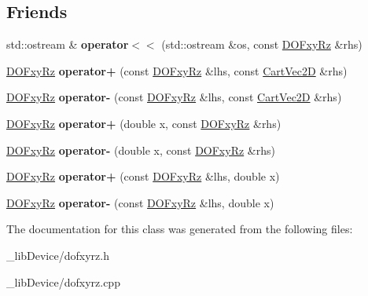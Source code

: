 \subsection*{Friends}
\begin{DoxyCompactItemize}
\item 
std\+::ostream \& {\bfseries operator$<$$<$} (std\+::ostream \&os, const \hyperlink{class_d_o_fxy_rz}{D\+O\+Fxy\+Rz} \&rhs)\hypertarget{class_d_o_fxy_rz_a1ac21ee73e0159236cde20f41914a132}{}\label{class_d_o_fxy_rz_a1ac21ee73e0159236cde20f41914a132}

\item 
\hyperlink{class_d_o_fxy_rz}{D\+O\+Fxy\+Rz} {\bfseries operator+} (const \hyperlink{class_d_o_fxy_rz}{D\+O\+Fxy\+Rz} \&lhs, const \hyperlink{class_cart_vec2_d}{Cart\+Vec2D} \&rhs)\hypertarget{class_d_o_fxy_rz_aea029119f4f15e337343dd9674c53314}{}\label{class_d_o_fxy_rz_aea029119f4f15e337343dd9674c53314}

\item 
\hyperlink{class_d_o_fxy_rz}{D\+O\+Fxy\+Rz} {\bfseries operator-\/} (const \hyperlink{class_d_o_fxy_rz}{D\+O\+Fxy\+Rz} \&lhs, const \hyperlink{class_cart_vec2_d}{Cart\+Vec2D} \&rhs)\hypertarget{class_d_o_fxy_rz_adb707d2ec2d85ef225d3ecedd0f72afa}{}\label{class_d_o_fxy_rz_adb707d2ec2d85ef225d3ecedd0f72afa}

\item 
\hyperlink{class_d_o_fxy_rz}{D\+O\+Fxy\+Rz} {\bfseries operator+} (double x, const \hyperlink{class_d_o_fxy_rz}{D\+O\+Fxy\+Rz} \&rhs)\hypertarget{class_d_o_fxy_rz_a3a29ac2f2a3ca9a5e9e960ce82f176bf}{}\label{class_d_o_fxy_rz_a3a29ac2f2a3ca9a5e9e960ce82f176bf}

\item 
\hyperlink{class_d_o_fxy_rz}{D\+O\+Fxy\+Rz} {\bfseries operator-\/} (double x, const \hyperlink{class_d_o_fxy_rz}{D\+O\+Fxy\+Rz} \&rhs)\hypertarget{class_d_o_fxy_rz_af2be5dcffff5323bcbfcaf49a4c291e8}{}\label{class_d_o_fxy_rz_af2be5dcffff5323bcbfcaf49a4c291e8}

\item 
\hyperlink{class_d_o_fxy_rz}{D\+O\+Fxy\+Rz} {\bfseries operator+} (const \hyperlink{class_d_o_fxy_rz}{D\+O\+Fxy\+Rz} \&lhs, double x)\hypertarget{class_d_o_fxy_rz_a504a54dd40576418831f0383ebd9f93a}{}\label{class_d_o_fxy_rz_a504a54dd40576418831f0383ebd9f93a}

\item 
\hyperlink{class_d_o_fxy_rz}{D\+O\+Fxy\+Rz} {\bfseries operator-\/} (const \hyperlink{class_d_o_fxy_rz}{D\+O\+Fxy\+Rz} \&lhs, double x)\hypertarget{class_d_o_fxy_rz_a855ad18215b9bcfbc09ca9e5b532b9d4}{}\label{class_d_o_fxy_rz_a855ad18215b9bcfbc09ca9e5b532b9d4}

\end{DoxyCompactItemize}


The documentation for this class was generated from the following files\+:\begin{DoxyCompactItemize}
\item 
\+\_\+lib\+Device/dofxyrz.\+h\item 
\+\_\+lib\+Device/dofxyrz.\+cpp\end{DoxyCompactItemize}
